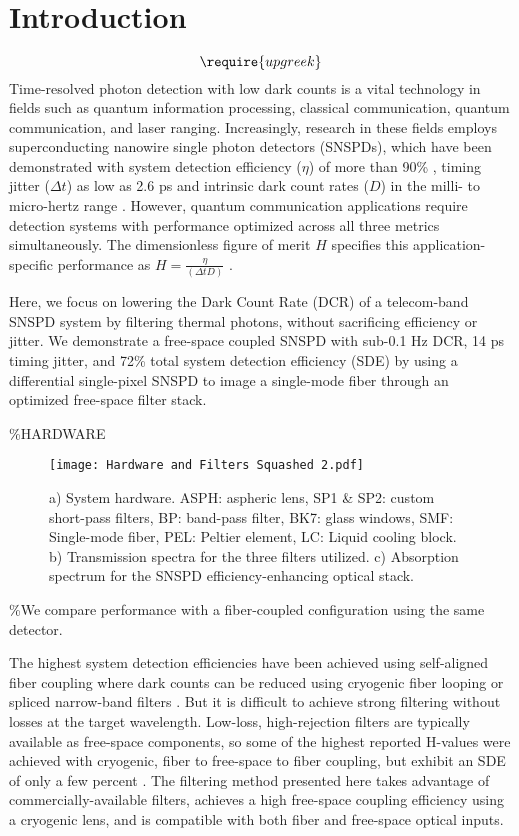 \documentclass[12pt]{caltech_thesis}
\begin{document}
\hypertarget{introduction}{%
\section{Introduction}\label{introduction}}

\[ \require{upgreek} \] Time-resolved photon detection with low dark
counts is a vital technology in fields such as quantum information
processing, classical communication, quantum communication, and laser
ranging. Increasingly, research in these fields employs superconducting
nanowire single photon detectors (SNSPDs), which have been demonstrated
with system detection efficiency (\(\eta\)) of more than 90\%
\autocite{Reddy2020}, timing jitter (\(\Delta t\)) as low as 2.6 ps
\autocite{Korzh2020} and intrinsic dark count rates (\(D\)) in the
milli- to micro-hertz range \autocite{Hochberg2019}. However, quantum
communication applications require detection systems with performance
optimized across all three metrics simultaneously. The dimensionless
figure of merit \(H\) specifies this application-specific performance as
\(H = \frac{\eta}{(\Delta t D)}\) \autocite{Hadfield2009}.

Here, we focus on lowering the Dark Count Rate (DCR) of a telecom-band
SNSPD system by filtering thermal photons, without sacrificing
efficiency or jitter. We demonstrate a free-space coupled SNSPD with
sub-0.1 Hz DCR, 14 ps timing jitter, and 72\% total system detection
efficiency (SDE) by using a differential single-pixel SNSPD
\autocite{Colangelo2021} to image a single-mode fiber through an
optimized free-space filter stack.

\%HARDWARE

\begin{figure}[htbp]
\centering\texttt{[image: Hardware and Filters Squashed 2.pdf]}
\caption{\small a) System hardware. ASPH: aspheric lens, %
SP1 \& SP2: custom short-pass filters, BP: band-pass filter, %
BK7: glass windows, SMF: Single-mode fiber, PEL: Peltier element, LC: Liquid cooling block. b) Transmission spectra for the three filters utilized. c) Absorption spectrum for the SNSPD efficiency-enhancing optical stack.}
\label{fig:setup}
\end{figure}

\%We compare performance with a fiber-coupled configuration using the
same detector.

The highest system detection efficiencies have been achieved using
self-aligned fiber coupling where dark counts can be reduced using
cryogenic fiber looping \autocite{Cohen2015} or spliced narrow-band
filters \autocite{Boaron2018secure}. But it is difficult to achieve
strong filtering without losses at the target wavelength. Low-loss,
high-rejection filters are typically available as free-space components,
so some of the highest reported H-values were achieved with cryogenic,
fiber to free-space to fiber coupling, but exhibit an SDE of only a few
percent \autocite{Shibata2015}. The filtering method presented here
takes advantage of commercially-available filters, achieves a high
free-space coupling efficiency using a cryogenic lens, and is compatible
with both fiber and free-space optical inputs.
\end{document}
